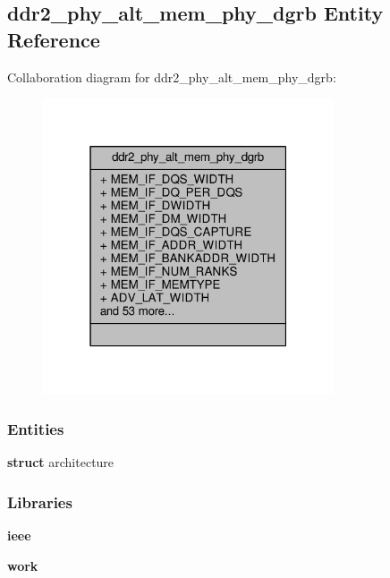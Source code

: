 \subsection{ddr2\+\_\+phy\+\_\+alt\+\_\+mem\+\_\+phy\+\_\+dgrb Entity Reference}
\label{classddr2__phy__alt__mem__phy__dgrb}


Collaboration diagram for ddr2\+\_\+phy\+\_\+alt\+\_\+mem\+\_\+phy\+\_\+dgrb\+:\nopagebreak
\begin{figure}[H]
\begin{center}
\leavevmode
\includegraphics[width=244pt]{d8/dfc/classddr2__phy__alt__mem__phy__dgrb__coll__graph}
\end{center}
\end{figure}
\subsubsection*{Entities}
\begin{DoxyCompactItemize}
\item 
{\bf struct} architecture
\end{DoxyCompactItemize}
\subsubsection*{Libraries}
 \begin{DoxyCompactItemize}
\item 
{\bf ieee} 
\item 
{\bf work} 
\end{DoxyCompactItemize}
